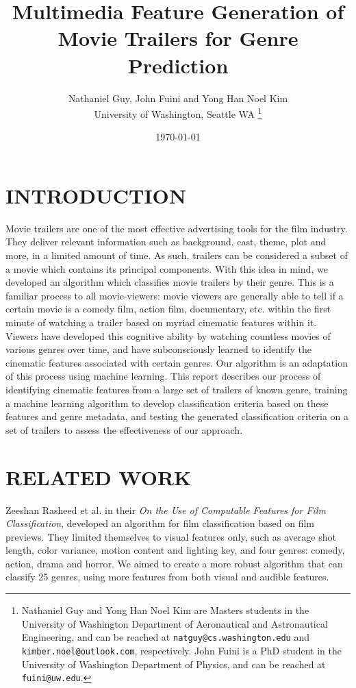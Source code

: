 \documentclass[letterpaper, 10 pt, conference]{ieeeconf}  %
\title{\LARGE \bf
Multimedia Feature Generation of Movie Trailers for Genre Prediction\\
}
\author{Nathaniel Guy, John Fuini and Yong Han Noel Kim\\
	University of Washington, Seattle WA%
\thanks{Nathaniel Guy and Yong Han Noel Kim are Masters students in the University of Washington Department of Aeronautical and Astronautical Engineering, and can be reached at {\tt\small natguy@cs.washington.edu} and {\tt\small kimber.noel@outlook.com}, respectively. John Fuini is a PhD student in the University of Washington Department of Physics, and can be reached at {\tt\small fuini@uw.edu}. }%
}
\date{ \today}
\begin{document}
\maketitle
\thispagestyle{empty}
\pagestyle{empty}

\begin{abstract}



\end{abstract}

\section{INTRODUCTION}
Movie trailers are one of the most effective advertising tools for the film industry. They deliver relevant information such as background, cast, theme, plot and more, in a limited amount of time. As such, trailers can be considered a subset of a movie which contains its principal components. With this idea in mind, we developed an algorithm which classifies movie trailers by their genre. This is a familiar process to all movie-viewers: movie viewers are generally able to tell if a certain movie is a comedy film, action film, documentary, etc. within the first minute of watching a trailer based on myriad cinematic features within it. Viewers have developed this cognitive ability by watching countless movies of various genres over time, and have subconsciously learned to identify the cinematic features associated with certain genres. Our algorithm is an adaptation of this process using machine learning. This report describes our process of identifying cinematic features from a large set of trailers of known genre, training a machine learning algorithm to develop classification criteria based on these features and genre metadata, and testing the generated classification criteria on a set of trailers to assess the effectiveness of our approach.

\section{RELATED WORK}
Zeeshan Rasheed et al. in their \textit{On the Use of Computable Features for Film Classification}\cite{Rasheed}, developed an algorithm for film classification based on film previews. They limited themselves to visual features only, such as average shot length, color variance, motion content and lighting key, and four genres: comedy, action, drama and horror. We aimed to create a more robust algorithm that can classify 25 genres, using more features from both visual and audible features.
\end{document}
